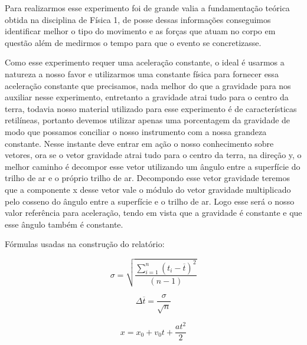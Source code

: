 
Para realizarmos esse experimento foi de grande valia a fundamentação teórica obtida na disciplina de Física 1, de posse dessas informações conseguimos identificar melhor o tipo do movimento e as forças que atuam no corpo em questão além de medirmos o tempo para que o evento se concretizasse. 

Como esse experimento requer uma aceleração constante, o ideal é usarmos a natureza a nosso favor e utilizarmos uma constante física para fornecer essa aceleração constante que precisamos, nada melhor do que a gravidade para nos auxiliar nesse experimento, entretanto a gravidade atrai tudo para o centro da terra, todavia nosso material utilizado para esse experimento é de características retilíneas, portanto devemos utilizar apenas uma porcentagem da gravidade de modo que possamos conciliar o nosso instrumento com a nossa grandeza constante. Nesse instante deve entrar em ação o nosso conhecimento sobre vetores, ora se o vetor gravidade atrai tudo para o centro da terra, na direção y, o melhor caminho é decompor esse vetor utilizando um ângulo entre a superfície do trilho de ar e o próprio trilho de ar. Decompondo esse vetor gravidade teremos que a componente x desse vetor vale o módulo do vetor gravidade multiplicado pelo cosseno do ângulo entre a superfície e o trilho de ar. Logo esse será o nosso valor referência para aceleração, tendo em vista que a gravidade é constante e que esse ângulo também é constante.

Fórmulas usadas na construção do relatório:

\begin{equation}\label{eq1}
\sigma = \sqrt{\frac{\sum_{i=1}^n (t_i-\overline{t})^2}{(n-1)}}
\end{equation}

\begin{equation}\label{eq2}
\Delta \overline{t}=\frac{\sigma}{\sqrt n}
\end{equation}

\begin{equation}\label{eq2}
x=x_0+v_0t+\frac{at^2}{2}
\end{equation}
